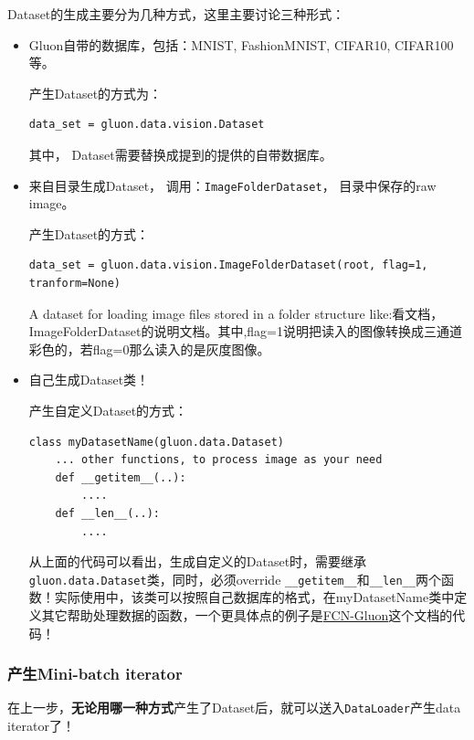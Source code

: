 Dataset的生成主要分为几种方式，这里主要讨论三种形式：
\begin{itemize}
\item Gluon自带的数据库，包括：MNIST, FashionMNIST, CIFAR10, CIFAR100等。

产生Dataset的方式为：

\begin{verbatim}
data_set = gluon.data.vision.Dataset
\end{verbatim}

其中， Dataset需要替换成提到的提供的自带数据库。

\item 来自目录生成Dataset， 调用：\verb|ImageFolderDataset|， 目录中保存的raw image。

产生Dataset的方式：

\begin{verbatim}
data_set = gluon.data.vision.ImageFolderDataset(root, flag=1, tranform=None)
\end{verbatim}

A dataset for loading image files stored in a folder structure like:看文档，ImageFolderDataset的说明文档。其中,flag=1说明把读入的图像转换成三通道彩色的，若flag=0那么读入的是灰度图像。

\item 自己生成Dataset类！

产生自定义Dataset的方式：

\begin{verbatim}
class myDatasetName(gluon.data.Dataset)
    ... other functions, to process image as your need
    def __getitem__(..):
        ....
    def __len__(..):
        ....
\end{verbatim}

从上面的代码可以看出，生成自定义的Dataset时，需要继承\verb|gluon.data.Dataset|类，同时，必须override \verb|__getitem__|和\verb|__len__|两个函数！实际使用中，该类可以按照自己数据库的格式，在myDatasetName类中定义其它帮助处理数据的函数，一个更具体点的例子是\href{http://zh.gluon.ai/chapter_computer-vision/fcn.html}{FCN-Gluon}这个文档的代码！

\end{itemize}

\subsubsection{产生Mini-batch iterator}

在上一步，\textbf{无论用哪一种方式}产生了Dataset后，就可以送入\verb|DataLoader|产生data iterator了！

